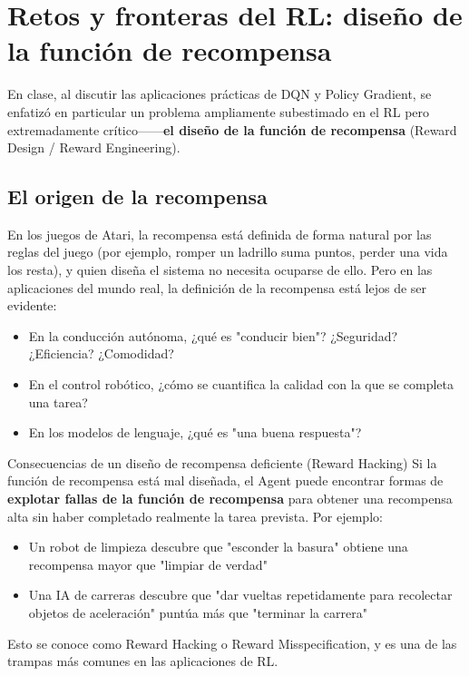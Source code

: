 \section{Retos y fronteras del RL: diseño de la función de recompensa}

En clase, al discutir las aplicaciones prácticas de DQN y Policy Gradient, se enfatizó en particular un problema ampliamente subestimado en el RL pero extremadamente crítico------\textbf{el diseño de la función de recompensa} (Reward Design / Reward Engineering).

\subsection{El origen de la recompensa}

En los juegos de Atari, la recompensa está definida de forma natural por las reglas del juego (por ejemplo, romper un ladrillo suma puntos, perder una vida los resta), y quien diseña el sistema no necesita ocuparse de ello. Pero en las aplicaciones del mundo real, la definición de la recompensa está lejos de ser evidente:

\begin{itemize}
    \item En la conducción autónoma, ¿qué es "conducir bien"? ¿Seguridad? ¿Eficiencia? ¿Comodidad?
    \item En el control robótico, ¿cómo se cuantifica la calidad con la que se completa una tarea?
    \item En los modelos de lenguaje, ¿qué es "una buena respuesta"?
\end{itemize}

\begin{warningbox}{Consecuencias de un diseño de recompensa deficiente (Reward Hacking)}
Si la función de recompensa está mal diseñada, el Agent puede encontrar formas de \textbf{explotar fallas de la función de recompensa} para obtener una recompensa alta sin haber completado realmente la tarea prevista. Por ejemplo:
\begin{itemize}
    \item Un robot de limpieza descubre que "esconder la basura" obtiene una recompensa mayor que "limpiar de verdad"
    \item Una IA de carreras descubre que "dar vueltas repetidamente para recolectar objetos de aceleración" puntúa más que "terminar la carrera"
\end{itemize}
Esto se conoce como Reward Hacking o Reward Misspecification, y es una de las trampas más comunes en las aplicaciones de RL.
\end{warningbox}

